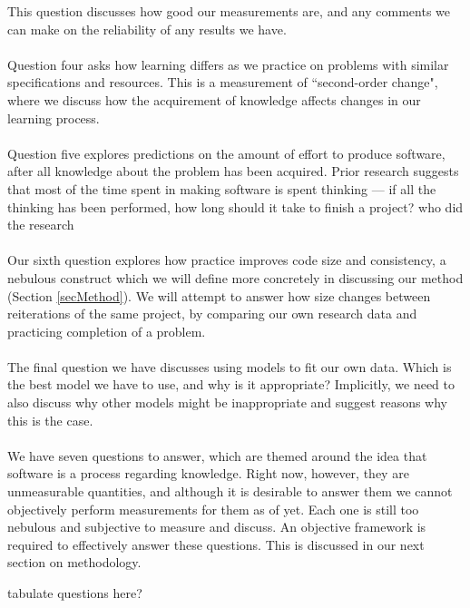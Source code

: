 This question discusses how good our measurements are, and any comments we can
make on the reliability of any results we have.\\
\\
Question four asks how learning differs as we practice on problems with similar
specifications and resources.
This is a measurement of ``second-order change", where we discuss how the
acquirement of knowledge affects changes in our learning process.\\
\\
Question five explores predictions on the amount of effort to produce software,
after all knowledge about the problem has been acquired.
Prior research suggests that most of the time spent in making software is spent
thinking --- if all the thinking has been performed, how long should it take to
finish a project? \FIXME who did the research \\
\\
Our sixth question explores how practice improves code size and consistency, a nebulous
construct which we will define more concretely in discussing our method (Section
\ref{secMethod}).
We will attempt to answer how size changes between reiterations of the same
project, by comparing our own research data and practicing completion of a
problem.\\
\\
The final question we have discusses using models to fit our own data.
Which is the best model we have to use, and why is it appropriate?
Implicitly, we need to also discuss why other models might be inappropriate and
suggest reasons why this is the case.\\
\\
We have seven questions to answer, which are themed around the idea that
software is a process regarding knowledge.
Right now, however, they are unmeasurable quantities, and although it is
desirable to answer them we cannot objectively perform measurements for them
as of yet.
Each one is still too nebulous and subjective to measure and discuss.
An objective framework is required to effectively answer these questions.
This is discussed in our next section on methodology.

\FIXME tabulate questions here?
